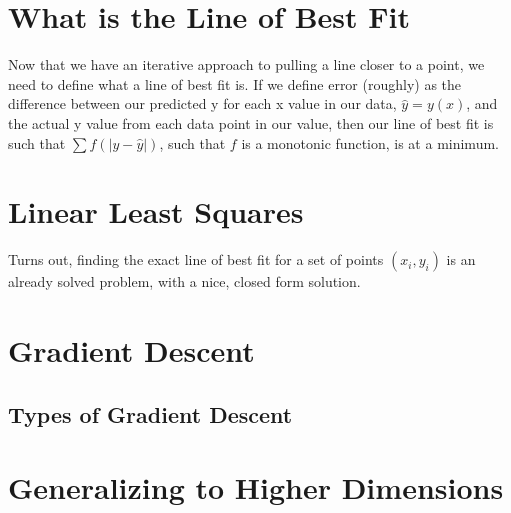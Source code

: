 \documentclass{article}
\begin{document}
\section{What is the Line of Best Fit}
Now that we have an iterative approach to pulling a line closer to a point, we need to define what a line of best fit is. If we define error (roughly) as the difference between our predicted y for each x value in our data, $\hat{y} = y(x)$, and the actual y value from each data point in our value, then our line of best fit is such that $\sum f(|y-\hat{y}|)$, such that $f$ is a monotonic function, is at a minimum.

\section{Linear Least Squares}

Turns out, finding the exact line of best fit for a set of points $(x_i, y_i)$ is an already solved problem, with a nice, closed form solution.  


\section{Gradient Descent}

\subsection{Types of Gradient Descent}

\section{Generalizing to Higher Dimensions}
\end{document}

